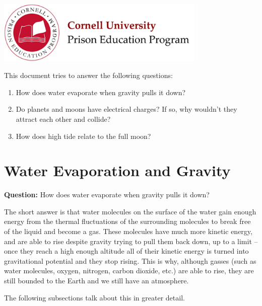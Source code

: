 \documentclass[addpoints,12pt]{exam}
\begin{document}

\begin{center}
\includegraphics[width=10cm]{../images/logo.png}
\end{center}

\begin{center}
\end{center}

\noindent This document tries to answer the following questions:
\begin{enumerate}
	\item How does water evaporate when gravity pulls it down?
	\item Do planets and moons have electrical charges? If so, why wouldn't they attract each other and collide?
	\item How does high tide relate to the full moon?
\end{enumerate}

\clearpage

\section{Water Evaporation and Gravity}

\noindent\textbf{Question:} How does water evaporate when gravity pulls it down?

\noindent The short answer is that water molecules on the surface of the water gain enough energy from the thermal fluctuations of the surrounding molecules to break free of the liquid and become a gas. These molecules have much more kinetic energy, and are able to rise despite gravity trying to pull them back down, up to a limit -- once they reach a high enough altitude all of their kinetic energy is turned into gravitational potential and they stop rising. This is why, although gasses (such as water molecules, oxygen, nitrogen, carbon dioxide, etc.) are able to rise, they are still bounded to the Earth and we still have an atmosphere.

\noindent The following subsections talk about this in greater detail.
\end{document}
